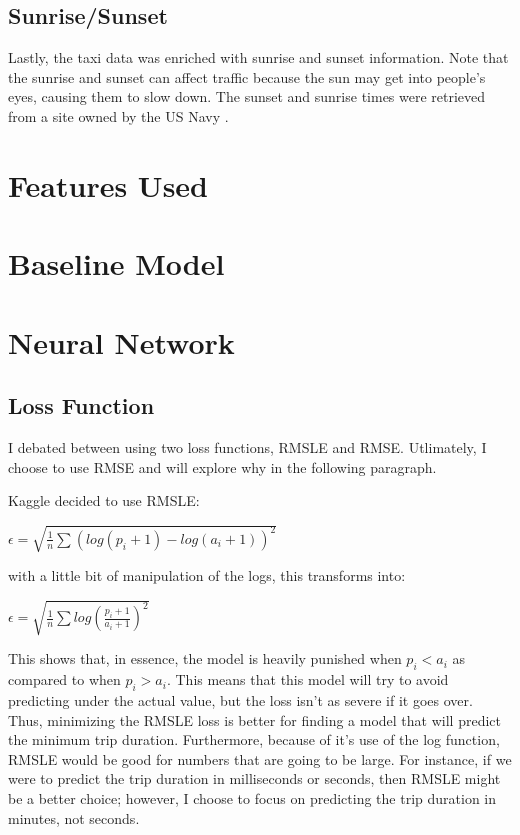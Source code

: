 \documentclass[conference]{IEEEtran}
\begin{document}
\subsection{Sunrise/Sunset}
Lastly, the taxi data was enriched with sunrise and sunset information.  Note that the sunrise and sunset can affect traffic because the sun may get into people's eyes, causing them to slow down.  The sunset and sunrise times were retrieved from a site owned by the US Navy \cite{sun}.


\section{Features Used}


\section {Baseline Model} \label{baseline}


\section{Neural Network}


\subsection{Loss Function} \label{loss}
I debated between using two loss functions, RMSLE and RMSE.  Utlimately, I choose to use RMSE and will explore why in the following paragraph.

Kaggle decided to use RMSLE:

$\epsilon = \sqrt{\frac{1}{n} \sum{(log(p_i + 1) - log(a_i + 1))^2}}$

with a little bit of manipulation of the logs, this transforms into:

$\epsilon = \sqrt{\frac{1}{n} \sum{log(\frac{p_i + 1}{a_i + 1})^2}}$

This shows that, in essence, the model is heavily punished when $p_i < a_i$ as compared to when $p_i > a_i$.  This means that this model will try to avoid predicting under the actual value, but the loss isn't as severe if it goes over.  Thus, minimizing the RMSLE loss is better for finding a model that will predict the minimum trip duration.  Furthermore, because of it's use of the log function, RMSLE would be good for numbers that are going to be large.  For instance, if we were to predict the trip duration in milliseconds or seconds, then RMSLE might be a better choice; however, I choose to focus on predicting the trip duration in minutes, not seconds.
\end{document}
